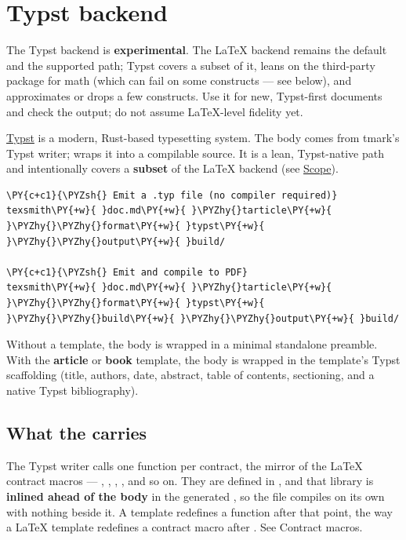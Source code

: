 \documentclass[a4paper,twoside]{article}
\begin{document}
\section{Typst backend}
\begin{tscallout}[kind=warning, title={Experimental}]
The Typst backend is \textbf{experimental}. The \LaTeX{} backend remains the
default and the supported path; Typst covers a subset of it, leans on the
third-party  package for math (which can fail on some constructs ---
see below), and approximates or drops a few constructs. Use it for new,
Typst-first documents and check the output; do not assume \LaTeX{}-level
fidelity yet.
\end{tscallout}
\href{https://typst.app}{Typst} is a modern, Rust-based typesetting system. The body
comes from tmark's Typst writer;  wraps it into a
compilable  source. It is a lean, Typst-native path and intentionally
covers a \textbf{subset} of the \LaTeX{} backend (see \hyperref[scope-and-limitations]{Scope}).
\begin{tscode}[lang=bash, engine=pygments]
\begin{Verbatim}[commandchars=\\\{\},breaklines, breakanywhere, commandchars=\\\{\}]
\PY{c+c1}{\PYZsh{} Emit a .typ file (no compiler required)}
texsmith\PY{+w}{ }doc.md\PY{+w}{ }\PYZhy{}tarticle\PY{+w}{ }\PYZhy{}\PYZhy{}format\PY{+w}{ }typst\PY{+w}{ }\PYZhy{}\PYZhy{}output\PY{+w}{ }build/

\PY{c+c1}{\PYZsh{} Emit and compile to PDF}
texsmith\PY{+w}{ }doc.md\PY{+w}{ }\PYZhy{}tarticle\PY{+w}{ }\PYZhy{}\PYZhy{}format\PY{+w}{ }typst\PY{+w}{ }\PYZhy{}\PYZhy{}build\PY{+w}{ }\PYZhy{}\PYZhy{}output\PY{+w}{ }build/
\end{Verbatim}
\end{tscode}
Without a template, the body is wrapped in a minimal standalone preamble. With
the \textbf{article} or \textbf{book} template, the body is wrapped in the template's
Typst scaffolding (title, authors, date, abstract, table of contents,
sectioning, and a native Typst bibliography).
\subsection{What the  carries}
The Typst writer calls one  function per contract, the mirror of the
\LaTeX{} contract macros --- , , , , and
so on. They are defined in , and
that library is \textbf{inlined ahead of the body} in the generated , so the
file compiles on its own with nothing beside it. A template redefines a
function after that point, the way a \LaTeX{} template redefines a contract macro
after . See Contract macros.
\end{document}
